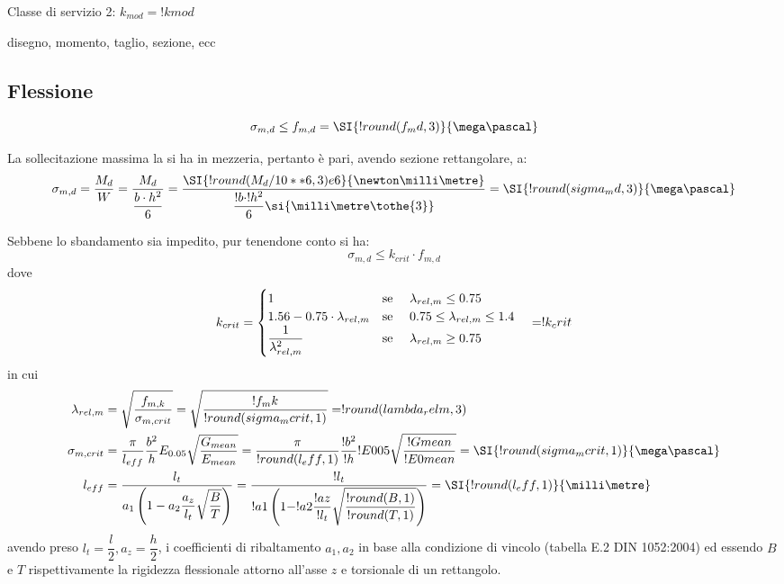 \begin{pysub}[TraveSolaio]
Classe di servizio 2: $k_{mod} = !{kmod}$


disegno, momento, taglio, sezione, ecc
\subsection{Flessione}
\begin{equation} 
    \sigma_{m,d} \leq f_{m,d} = \SI{!{round(f_md,3)}}{\mega\pascal}
\end{equation}

La sollecitazione massima la si ha in mezzeria, pertanto è pari, avendo sezione rettangolare, a:
\[
\sigma_{m,d} 
= \frac{M_d}{W} 
= \frac{M_d}{\dfrac {b \cdot h^2}{6}} 
= \frac{\SI{!{round(M_d/10**6,3)}e6}{\newton\milli\metre}} {\dfrac {!{b} \cdot !{h}^2}{6} \si{\milli\metre\tothe{3}}} 
= \SI{!{round(sigma_md,3)}}{\mega\pascal} 
\]


Sebbene lo sbandamento sia impedito, pur tenendone conto si ha:
\begin{equation}
     \sigma_{m,d} \leq k_{crit} \cdot f_{m,d} 
\end{equation}
dove 
\begin{equation}
    k_{crit} =
    \begin{cases}
        1 & \text{se \quad $ \lambda_{rel,m} \leq 0.75$} \\
        1.56 - 0.75 \cdot \lambda_{rel,m} & \text{se \quad $0.75 \leq \lambda_{rel,m} \leq 1.4$} \\
        \dfrac{1}{\lambda_{rel,m}^2} & \text{se \quad $\lambda_{rel,m} \geq 0.75$}
    \end{cases}
    \quad =  !{k_crit}
\end{equation}
in cui 
\[
\begin{split}
    \lambda_{rel,m} 
    &= \sqrt{  \frac{f_{m,k}}     {\sigma_{m,crit}}          } 
    = \sqrt{  \frac{!{f_mk}}     {!{round(sigma_mcrit,1)}}  } 
    = !{round(lambda_relm,3)} \\
    \sigma_{m,crit} 
    &= \dfrac{\pi}{l_{eff}} \dfrac{b^2}{h} E_{0.05} \sqrt{\dfrac{G_{mean}}{E_{mean}}} 
    = \dfrac{\pi}{!{round(l_eff,1)}} \dfrac{!{b}^2}{!{h}} !{E005} \sqrt{\dfrac{!{Gmean}}{!{E0mean}}} 
    = \SI{!{round(sigma_mcrit,1)}}{\mega\pascal} \\
    l_{eff}  
    &= \frac{l_t}{a_1 \left(1 - a_2  \dfrac{a_z}{l_t} \sqrt{\dfrac{B}{T}}\right)} 
    = \frac{!{l_t}}{!{a1} \left(1 - !{a2}  \dfrac{!{az}}{!{l_t}} \sqrt{\dfrac{!{round(B,1)}}{!{round(T,1)}}}\right)}
    =   
    \SI{!{round(l_eff,1)}}{\milli\metre}
\end{split}
\]
avendo preso $l_t = \dfrac{l}{2}, a_z = \dfrac{h}{2}$, i coefficienti di ribaltamento $a_1, a_2$ in base alla condizione di vincolo (tabella E.2 DIN 1052:2004) ed essendo $B$ e $T$ rispettivamente la rigidezza flessionale attorno all'asse $z$ e torsionale di un rettangolo.


\end{pysub}
